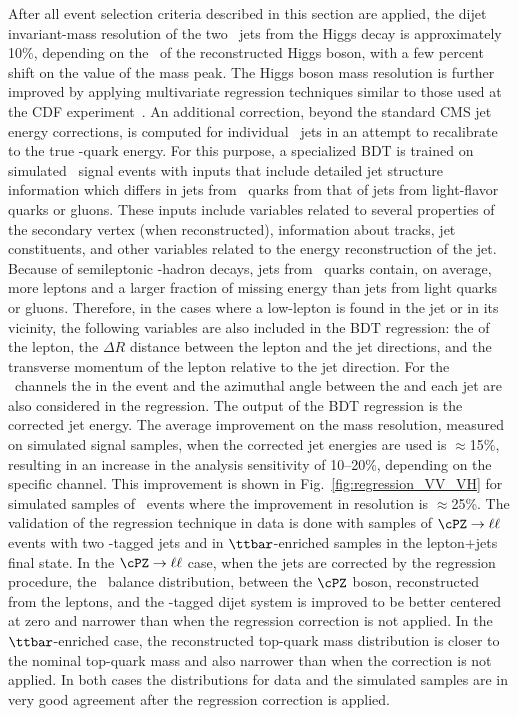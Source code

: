 \documentclass[12pt,twoside,a4paper,cmspaper,final,collab]{cms-tdr}
\begin{document}
After all
event selection criteria described in this section are applied, the
dijet invariant-mass resolution of the two \cPqb\ jets from the Higgs decay is
approximately 10\%, depending on the \pt\ of the reconstructed Higgs boson,
with a few percent shift on the value of the mass peak. The Higgs boson mass resolution
is further improved by applying multivariate regression techniques similar to those used at
the CDF experiment~\cite{1107.3026}. An additional correction, beyond the
standard CMS jet energy corrections, is computed for
individual \cPqb\ jets in an attempt to recalibrate to the true \cPqb-quark
energy. For this purpose, a specialized BDT is trained on
simulated \HBB\ signal events with
inputs that include detailed  jet structure information
which differs in jets from \cPqb\ quarks from that of jets from light-flavor
quarks or gluons.
These inputs include variables related to several properties of the secondary vertex
(when reconstructed), information about tracks, jet constituents, and
other variables related to the energy reconstruction of the jet.
Because of semileptonic \cPqb-hadron decays, jets from \cPqb\ quarks contain, on average, more leptons and a larger
fraction of missing energy than jets from light quarks or gluons. Therefore,
in the cases where a low-\pt lepton is found in the jet or in its
vicinity, the following variables are also included in the
BDT regression: the \pt
of the lepton, the $\Delta R$ distance between the lepton and the jet
directions, and the
transverse momentum
of the lepton relative to the jet direction. For the \ZllH\ channels the \MET in the event and the azimuthal angle
between the \MET and each jet are also considered in the regression.
The output of the BDT regression is the corrected jet energy.
The average improvement on the mass resolution, measured on simulated
signal samples, when the corrected jet energies
are used is $\approx$15\%, resulting in an increase in the analysis sensitivity of
10--20\%, depending on the specific channel. This improvement is shown
in Fig.~\ref{fig:regression_VV_VH} for simulated samples of \ZllHbb\ events where the improvement in resolution is $\approx$25\%. The
validation of the regression technique in data is done with samples of
$\cPZ\to\ell\ell$ events with two \cPqb-tagged jets and in  $\ttbar$-enriched samples in the lepton+jets final state. In the $\cPZ\to\ell\ell$ case, when the jets are corrected by
  the regression procedure, the \pt\ balance distribution, between the
  $\cPZ$ boson, reconstructed from the leptons, and the \cPqb-tagged dijet
  system is improved to be better centered at zero and narrower than
  when the regression correction is not applied. In the  $\ttbar$-enriched case, the reconstructed top-quark mass distribution is closer to the nominal top-quark mass
  and also narrower than when the correction is not applied. In both
  cases the distributions for data and the simulated samples are
  in very good agreement after the regression correction is applied.
\end{document}
